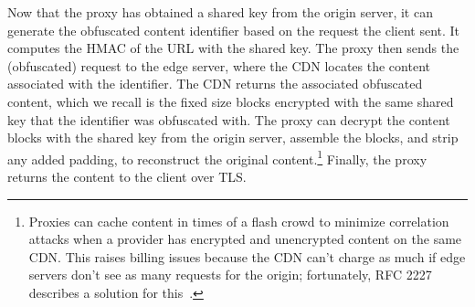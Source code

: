Now that the proxy has obtained a shared key from the origin server, it can generate the obfuscated content identifier based 
on the request the client sent.  It computes the HMAC of the URL with the shared key.  The proxy then 
sends the (obfuscated) request to the edge server, where the CDN locates the content associated with the identifier.  The CDN returns 
the associated obfuscated content, which we recall is the fixed size blocks encrypted with the same shared key that the identifier was 
obfuscated with.  The proxy can decrypt the content blocks with the shared key from the origin server, assemble the blocks, and strip any 
added padding, to reconstruct the original content.\footnote{Proxies can cache content in times of a flash crowd to minimize correlation attacks when a provider has encrypted and unencrypted content on the same CDN.  This raises billing issues because the CDN can’t charge as much if edge servers don’t see as many requests for the origin; fortunately, RFC 2227 describes a solution for this~\cite{rfc2227}.}  Finally, the proxy returns the content to the client over TLS.  


